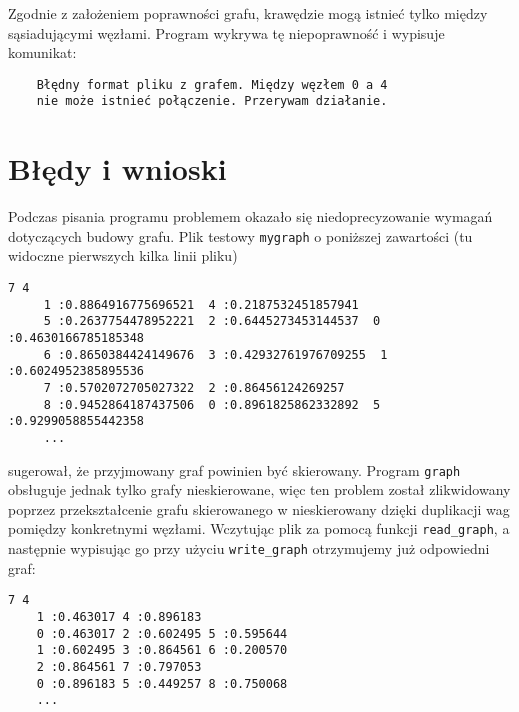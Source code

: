 \documentclass[]{article}
\begin{document}
\begin{enumerate}
\begin{figure}
\end{figure}
\newline
Zgodnie z założeniem poprawności grafu, krawędzie mogą istnieć tylko między sąsiadującymi węzłami. Program wykrywa tę niepoprawność i wypisuje komunikat:
\begin{verbatim}
    Błędny format pliku z grafem. Między węzłem 0 a 4 
    nie może istnieć połączenie. Przerywam działanie.
\end{verbatim}

\end{enumerate}

\section{Błędy i wnioski}\label{header-n233}
Podczas pisania programu problemem okazało się niedoprecyzowanie wymagań dotyczących budowy grafu. Plik testowy \texttt{mygraph} o poniższej zawartości (tu widoczne pierwszych kilka linii pliku)
\begin{verbatim}
7 4
	 1 :0.8864916775696521  4 :0.2187532451857941 
	 5 :0.2637754478952221  2 :0.6445273453144537  0 :0.4630166785185348 
	 6 :0.8650384424149676  3 :0.42932761976709255  1 :0.6024952385895536 
	 7 :0.5702072705027322  2 :0.86456124269257 
	 8 :0.9452864187437506  0 :0.8961825862332892  5 :0.9299058855442358 
	 ...
	 \end{verbatim}
sugerował, że przyjmowany graf powinien być skierowany. Program \texttt{graph} obsługuje jednak tylko grafy nieskierowane, więc ten problem został zlikwidowany poprzez przekształcenie grafu skierowanego w nieskierowany dzięki duplikacji wag pomiędzy konkretnymi węzłami. Wczytując plik za pomocą funkcji \texttt{read\_graph}, a następnie wypisując go przy użyciu \texttt{write\_graph} otrzymujemy już odpowiedni graf: 
\bigskip
\begin{verbatim}
7 4
	1 :0.463017 4 :0.896183 
	0 :0.463017 2 :0.602495 5 :0.595644 
	1 :0.602495 3 :0.864561 6 :0.200570 
	2 :0.864561 7 :0.797053 
	0 :0.896183 5 :0.449257 8 :0.750068
	...
\end{verbatim}
\end{document}
